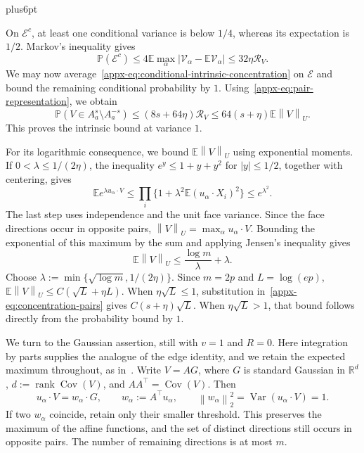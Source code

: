 \documentclass[11pt,letterpaper,twoside,leqno]{article}
\makeatletter
\theoremstyle{bookplain}
\theoremstyle{bookremark}
\renewenvironment{proof}[1][\proofname]{\par
  \pushQED{\qed}\normalfont\topsep6pt plus6pt\relax
  \trivlist\item[\hskip\labelsep\bfseries #1\@addpunct{.}]\ignorespaces
}{\popQED\endtrivlist\@endpefalse}
\newcommand{\E}{\mathbb E}
\newcommand{\Pp}{\mathbb P}
\newcommand{\R}{\mathbb R}
\newcommand{\Cov}{\operatorname{Cov}}
\newcommand{\Var}{\operatorname{Var}}
\newcommand{\norm}[1]{\left\lVert#1\right\rVert}
\makeatother
\begin{document}
\begin{proof}[Proof of Lemma~\ref{lem:concentration}]
On $\mathcal E^c$, at least one conditional variance is below
$1/4$, whereas its expectation is $1/2$. Markov's inequality gives
\begin{equation}
 \Pp(\mathcal E^c)
 \le4\E\max_\alpha|\mathcal V_\alpha-\E\mathcal V_\alpha|
 \le32\eta\mathcal R_V.
 \label{appx-eq:conditional-variance}
\end{equation}
We may now average~\eqref{appx-eq:conditional-intrinsic-concentration}
on $\mathcal E$ and bound the remaining conditional probability
by $1$. Using~\eqref{appx-eq:pair-representation}, we obtain
\begin{equation}
 \Pp(V\in A_a^s\setminus A_a^{-s})
 \le(8s+64\eta)\mathcal R_V
 \le64(s+\eta)\E\norm V_U.
 \label{appx-eq:concentration-pairs}
\end{equation}
This proves the intrinsic bound at variance $1$.

For its logarithmic consequence, we bound $\E\norm V_U$ using
exponential moments. If $0<\lambda\le1/(2\eta)$, the inequality
$e^y\le1+y+y^2$ for $|y|\le1/2$, together with centering, gives
\[
 \E e^{\lambda u_\alpha\cdot V}
 \le\prod_i\{1+\lambda^2\E(u_\alpha\cdot X_i)^2\}
 \le e^{\lambda^2}.
\]
The last step uses independence and the unit face variance.
Since the face directions occur in opposite pairs,
$\norm V_U=\max_\alpha u_\alpha\cdot V$.
Bounding the exponential of this maximum by the sum and applying
Jensen's inequality gives
\[
 \E\norm V_U\le\frac{\log m}{\lambda}+\lambda.
\]
Choose $\lambda:=\min\{\sqrt{\log m},1/(2\eta)\}$.
Since $m=2p$ and $L=\log(ep)$,
$\E\norm V_U\le C(\sqrt L+\eta L)$.
When $\eta\sqrt L\le1$, substitution
in~\eqref{appx-eq:concentration-pairs} gives $C(s+\eta)\sqrt L$.
When $\eta\sqrt L>1$, that bound follows directly from the
probability bound by $1$.

We turn to the Gaussian assertion, still with $v=1$ and $R=0$.
Here integration by parts supplies the analogue of the edge
identity, and we retain the expected maximum throughout,
as in~\cite{ChernozhukovAC2026}.
Write $V=AG$, where $G$ is standard Gaussian in $\R^d$,
$d:=\operatorname{rank}\Cov(V)$, and $AA^\top=\Cov(V)$.
Then
\[
 u_\alpha\cdot V=w_\alpha\cdot G,\qquad
 w_\alpha:=A^\top u_\alpha,\qquad
 \norm{w_\alpha}_2^2=\Var(u_\alpha\cdot V)=1.
\]
If two $w_\alpha$ coincide, retain only their smaller threshold.
This preserves the maximum of the affine functions, and the set of
distinct directions still occurs in opposite pairs. The number of
remaining directions is at most $m$.


\end{proof}
\end{document}
